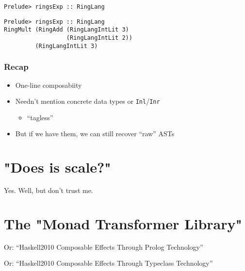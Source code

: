 \documentclass[pdf]{beamer}
\begin{document}
\begin{frame}[fragile]
\begin{lstlisting}
Prelude> ringsExp :: RingLang

\end{lstlisting}
\end{frame}

\begin{frame}[fragile]
\begin{lstlisting}
Prelude> ringsExp :: RingLang
RingMult (RingAdd (RingLangIntLit 3) 
                  (RingLangIntLit 2)) 
         (RingLangIntLit 3)
\end{lstlisting}
\end{frame}

\begin{frame}
  \frametitle{Recap}
  \begin{itemize}
  \pause
  \item One-line composabiity
  \pause
  \item Needn't mention concrete data types or \lstinline{Inl}/\lstinline{Inr}
    \pause
    \begin{itemize}
    \item ``tagless''
    \end{itemize}
  \pause
  \item But if we have them, we can still recover ``raw'' ASTs
  \end{itemize}
\end{frame}

\section{"Does is scale?"}

\begin{frame}
  Yes. \pause Well, but don't trust me.
\end{frame}

\section{The "Monad Transformer Library"}

\begin{frame}
  Or: ``Haskell2010 Composable Effects Through Prolog Technology''
\end{frame}

\begin{frame}
  Or: ``Haskell2010 Composable Effects Through Typeclass Technology''
\end{frame}
\end{document}

